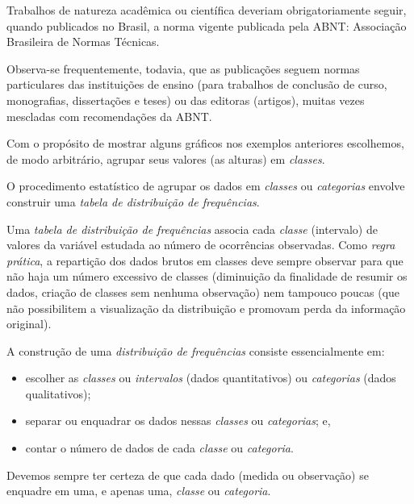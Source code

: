 \documentclass[
]{book}
\providecommand{\tightlist}{%
  \setlength{\itemsep}{0pt}\setlength{\parskip}{0pt}}
\begin{document}
\hfill\break

Trabalhos de natureza acadêmica ou científica deveriam obrigatoriamente seguir, quando publicados no Brasil, a norma vigente publicada pela ABNT: Associação Brasileira de Normas Técnicas.

\hfill\break

Observa-se frequentemente, todavia, que as publicações seguem normas particulares das instituições de ensino (para trabalhos de conclusão de curso, monografias, dissertações e teses) ou das editoras (artigos), muitas vezes mescladas com recomendações da ABNT.

\hfill\break

Com o propósito de mostrar alguns gráficos nos exemplos anteriores escolhemos, de modo arbitrário, agrupar seus valores (as alturas) em \emph{classes}.

\hfill\break

O procedimento estatístico de agrupar os dados em \emph{classes} ou \emph{categorias} envolve construir uma \emph{tabela de distribuição de frequências}.

\hfill\break

Uma \emph{tabela de distribuição de frequências} associa cada \emph{classe} (intervalo) de valores da variável estudada ao número de ocorrências observadas. Como \emph{regra prática}, a repartição dos dados brutos em classes deve sempre observar para que não haja um número excessivo de classes (diminuição da finalidade de resumir os dados, criação de classes sem nenhuma observação) nem tampouco poucas (que não possibilitem a visualização da distribuição e promovam perda da informação original).

\hfill\break

A construção de uma \emph{distribuição de frequências} consiste essencialmente em:

\hfill\break

\begin{itemize}
\tightlist
\item
  escolher as \emph{classes} ou \emph{intervalos} (dados quantitativos) ou \emph{categorias} (dados qualitativos);
\item
  separar ou enquadrar os dados nessas \emph{classes} ou \emph{categorias}; e,
\item
  contar o número de dados de cada \emph{classe} ou \emph{categoria}.
\end{itemize}

\hfill\break

Devemos sempre ter certeza de que cada dado (medida ou observação) se enquadre em uma, e apenas uma, \emph{classe} ou \emph{categoria}.
\end{document}
